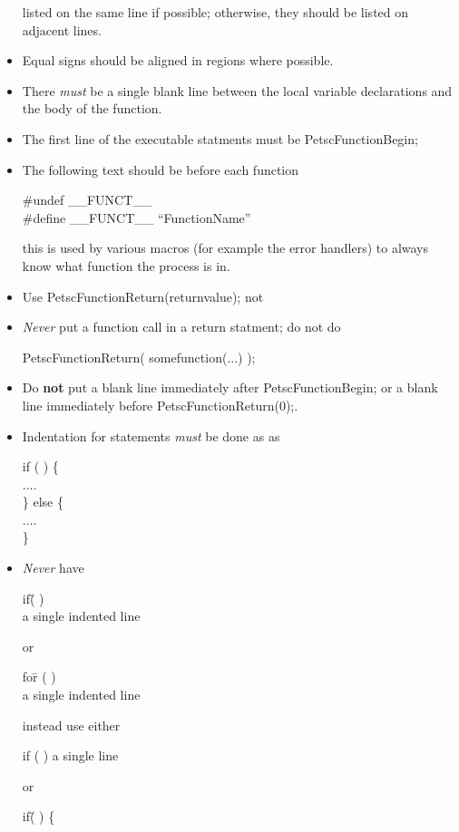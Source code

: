 \documentclass[twoside,12pt]{../sty/report_petsc}
\begin{document}
\begin{itemize}
      listed on the same line if possible; otherwise, they should be listed
      on adjacent lines.
\item Equal signs should be aligned in regions where possible.
\item There {\em must} be a single blank line
      between the local variable declarations and the body of the function.
\item The first line of the executable statments must be PetscFunctionBegin;
\item The following text should be before each function
\begin{tabbing}
\#undef \_\_FUNCT\_\_\\
\#define \_\_FUNCT\_\_ ``FunctionName''
\end{tabbing}
this is used by various macros (for example the error handlers) to always know
what function the process is in.
\item Use PetscFunctionReturn(returnvalue); not 
\item {\em Never} put a function call in a return statment; do not do
\begin{tabbing}
   PetscFunctionReturn( somefunction(...) );
\end{tabbing}
\item Do {\bf not} put a blank line immediately after PetscFunctionBegin; or
a blank line immediately before PetscFunctionReturn(0);.
\item Indentation for  statements {\em must}  be done  as
as
\begin{tabbing}
   if (  ) \{\\
     ....\\
   \} else \{\\
     ....\\
   \}
\end{tabbing}
\item {\em Never}  have
\begin{tabbing}
   if\= (  ) \\
     \>a single indented line
\end{tabbing}
or
\begin{tabbing}
   fo\=r (  ) \\
     \>a single indented line
\end{tabbing}
instead use either
\begin{tabbing}
   if (  ) a single line
\end{tabbing}
or
\begin{tabbing}
   if\= (  ) \{\\

\end{tabbing}
\end{itemize}
\end{document}

